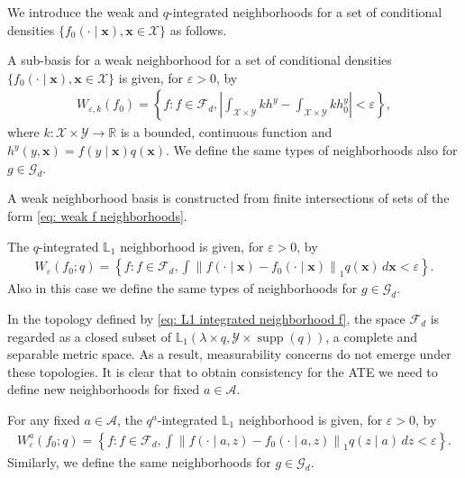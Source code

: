 We introduce the weak and \(q\)-integrated neighborhoods for a set of conditional densities \(\{f_0(\cdot \mid \boldsymbol{x}), \boldsymbol{x} \in \mathcal{X}\}\) as follows. 
\begin{definition}
A sub-basis for a weak neighborhood for a set of conditional densities \(\{f_0(\cdot \mid \boldsymbol{x}), \boldsymbol{x} \in \mathcal{X}\}\) is given, for $\varepsilon > 0$, by
\begin{align}\label{eq: weak f neighborhoods}
W_{\varepsilon, k}(f_0) = \left\{f: f \in \mathcal{F}_d, \left|\int_{\mathcal{X} \times \mathcal{Y}} k h^y - \int_{\mathcal{X} \times \mathcal{Y}} k h^y_0\right| < \varepsilon \right\},
\end{align}
where \(k: \mathcal{X} \times \mathcal{Y} \to \mathbb{R}\) is a bounded, continuous function and $h^y(y,\boldsymbol{x}) = f(y \mid \boldsymbol{x}) q(\boldsymbol{x})$. We define the same types of neighborhoods also for $g \in \mathcal{G}_d$.
\end{definition}
A weak neighborhood basis is constructed from finite intersections of sets of the form \eqref{eq: weak f neighborhoods}. 
\begin{definition}
The \(q\)-integrated \(\mathbb{L}_1\) neighborhood is given, for $\varepsilon > 0$, by
\begin{align}\label{eq: L1 integrated neighborhood f}
W_\varepsilon(f_0; q) = \left\{f: f \in \mathcal{F}_d, \int \left\|f(\cdot \mid \boldsymbol{x}) - f_0(\cdot \mid \boldsymbol{x})\right\|_{1} q(\boldsymbol{x}) \, d\boldsymbol{x} < \varepsilon \right\}.
\end{align}
Also in this case we define the same types of neighborhoods for $g \in \mathcal{G}_d$.    
\end{definition}
In the topology defined by \eqref{eq: L1 integrated neighborhood f}, the space \(\mathcal{F}_d\) is regarded as a closed subset of \(\mathbb{L}_1(\lambda \times q, \mathcal{Y} \times \operatorname{supp}(q))\), a complete and separable metric space. As a result, measurability concerns do not emerge under these topologies. It is clear that to obtain consistency for the ATE we need to define new neighborhoods for fixed $a \in \mathcal{A}$.
\begin{definition}
    For any fixed $a \in \mathcal{A}$, the \(q^a\)-integrated \(\mathbb{L}_1\) neighborhood is given, for $\varepsilon > 0$, by
    \begin{align}\label{eq: a-L1 integrated neighborhood f}
    W^a_\varepsilon(f_0; q) = \left\{f: f \in \mathcal{F}_d, \int \left\|f(\cdot \mid a,z) - f_0(\cdot \mid a,z)\right\|_{1} q(z \mid a) \, d z < \varepsilon \right\}.
\end{align}    
Similarly, we define the same neighborhoods for $g \in \mathcal{G}_d$.
\end{definition}
